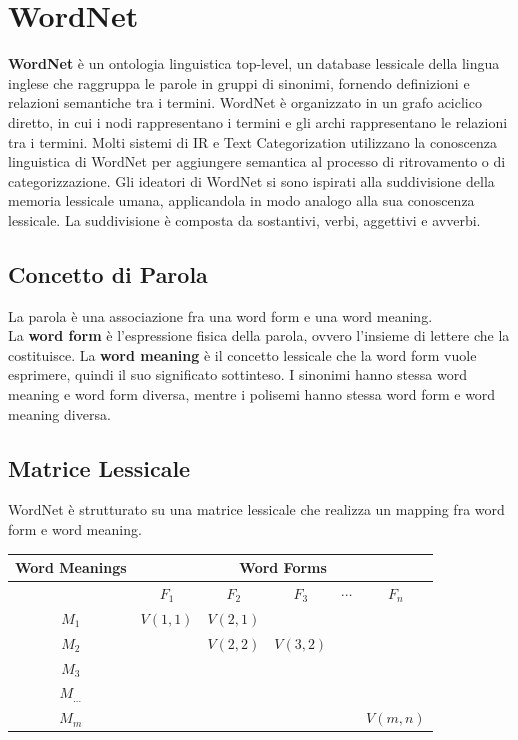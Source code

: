 \documentclass{report}
\begin{document}
	\section{WordNet}
	\textbf{WordNet} è un ontologia linguistica top-level, un database lessicale della lingua inglese che raggruppa le parole in gruppi di sinonimi, fornendo definizioni e relazioni semantiche tra i termini. WordNet è organizzato in un grafo aciclico diretto, in cui i nodi rappresentano i termini e gli archi rappresentano le relazioni tra i termini. Molti sistemi di IR e Text Categorization utilizzano la conoscenza linguistica di WordNet per aggiungere semantica al processo di ritrovamento o di categorizzazione. Gli ideatori di WordNet si sono ispirati alla suddivisione della memoria lessicale umana, applicandola in modo analogo alla sua conoscenza lessicale. La suddivisione è composta da sostantivi, verbi, aggettivi e avverbi.

	\subsection{Concetto di Parola}
	La parola è una associazione fra una word form e una word meaning.
	\vspace{\baselineskip}\\
	La \textbf{word form} è l'espressione fisica della parola, ovvero l'insieme di lettere che la costituisce. La \textbf{word meaning} è il concetto lessicale che la word form vuole esprimere, quindi il suo significato sottinteso. I sinonimi hanno stessa word meaning e word form diversa, mentre i polisemi hanno stessa word form e word meaning diversa.

	\subsection{Matrice Lessicale}
	WordNet è strutturato su una matrice lessicale che realizza un mapping fra word form e word meaning.
	\begin{table}[h!]
		\centering
		\renewcommand{\arraystretch}{1.5}
		\begin{tabular}{|c|c|c|c|c|c|}
			\hline
			\multicolumn{1}{|c|}{\textbf{Word Meanings}} & \multicolumn{5}{c|}{\textbf{Word Forms}} \\ \hline
			& $F_1$ & $F_2$ & $F_3$ & $\cdots$ & $F_n$ \\ \hline
			$M_1$ & $V(1,1)$ & $V(2,1)$ & & & \\ \hline
			$M_2$ & & $V(2,2)$ & $V(3,2)$ & & \\ \hline
			$M_3$ & & & & & \\ \hline
			$M_{\dots}$ & & & & & \\ \hline
			$M_m$ & & & & & $V(m,n)$ \\ \hline
		\end{tabular}
	\end{table}
	
\end{document}
